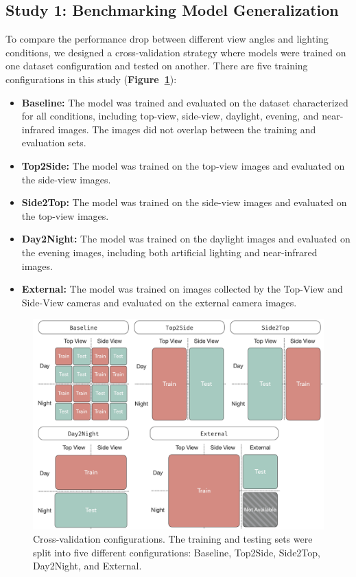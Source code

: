 \subsection{Study 1: Benchmarking Model Generalization}
To compare the performance drop between different view angles and lighting conditions, we designed a cross-validation strategy where models were trained on one dataset configuration and tested on another. There are five training configurations in this study (\textbf{Figure~\ref{fig:splits}}):

\begin{itemize}
    \item \textbf{Baseline:} The model was trained and evaluated on the dataset characterized for all conditions, including top-view, side-view, daylight, evening, and near-infrared images. The images did not overlap between the training and evaluation sets.
    \item \textbf{Top2Side:} The model was trained on the top-view images and evaluated on the side-view images.
    \item \textbf{Side2Top:} The model was trained on the side-view images and evaluated on the top-view images.
    \item \textbf{Day2Night:} The model was trained on the daylight images and evaluated on the evening images, including both artificial lighting and near-infrared images.
    \item \textbf{External:} The model was trained on images collected by the Top-View and Side-View cameras and evaluated on the external camera images.
\end{itemize}



\begin{figure}[!t]
    \centerline{\includegraphics[width=0.8\columnwidth]{figure_2.jpg}}
    \caption{Cross-validation configurations. The training and testing sets were split into five different configurations: Baseline, Top2Side, Side2Top, Day2Night, and External.}
    \label{fig:splits}
\end{figure}

